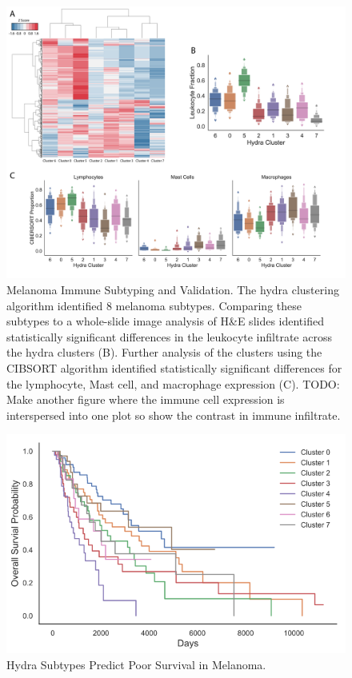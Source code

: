 \documentclass[fleqn,10pt]{wlscirep}
\begin{document}

\begin{figure}
	\centering
	\includegraphics[width=0.75\linewidth]{images/melanoma-immune-subtypes-immport-boxen@2x.png}
	\caption{Melanoma Immune Subtyping and Validation. The hydra clustering algorithm identified 8 melanoma subtypes. Comparing these subtypes to a whole-slide image analysis of H\&E slides identified statistically significant differences in the leukocyte infiltrate across the hydra clusters (B). Further analysis of the clusters using the CIBSORT algorithm identified statistically significant differences for the lymphocyte, Mast cell, and macrophage expression (C). TODO: Make another figure where the immune cell expression is interspersed into one plot so show the contrast in immune infiltrate.}
	\label{sfig:melanoma}
\end{figure}


\begin{figure}
	\centering
	\includegraphics[width=0.75\linewidth]{images/immport-skcm-cluster-survival.png}
	\caption{Hydra Subtypes Predict Poor Survival in Melanoma.}
	\label{sfig:melanoma-surv}
\end{figure}
\end{document}
